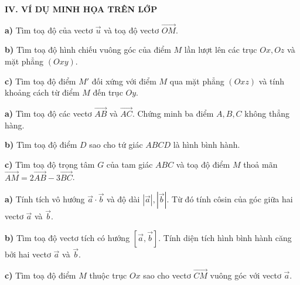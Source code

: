 \documentclass[12pt, a4paper]{article}
\begin{document}
\par\vspace{0.15cm}

\newpage

\noindent\textbf{\textcolor{deepblue}{\large IV. VÍ DỤ MINH HỌA TRÊN LỚP}}
\par\vspace{-0.15cm}

\par\vspace{0.2cm}
\textbf{a)} Tìm toạ độ của vectơ $\vec{u}$ và toạ độ vectơ $\vec{OM}$. \par\vspace{0.15cm}
\textbf{b)} Tìm toạ độ hình chiếu vuông góc của điểm $M$ lần lượt lên các trục $Ox, Oz$ và mặt phẳng $(Oxy)$. \par\vspace{0.15cm}
\textbf{c)} Tìm toạ độ điểm $M'$ đối xứng với điểm $M$ qua mặt phẳng $(Oxz)$ và tính khoảng cách từ điểm $M$ đến trục $Oy$.
\drawdashlinesfull

\par\vspace{0.2cm}
\textbf{a)} Tìm toạ độ các vectơ $\vec{AB}$ và $\vec{AC}$. Chứng minh ba điểm $A, B, C$ không thẳng hàng. \par\vspace{0.15cm}
\textbf{b)} Tìm toạ độ điểm $D$ sao cho tứ giác $ABCD$ là hình bình hành. \par\vspace{0.15cm}
\textbf{c)} Tìm toạ độ trọng tâm $G$ của tam giác $ABC$ và toạ độ điểm $M$ thoả mãn $\vec{AM} = 2\vec{AB} - 3\vec{BC}$.
\drawdashlinesfull

\par\vspace{0.2cm}
\textbf{a)} Tính tích vô hướng $\vec{a} \cdot \vec{b}$ và độ dài $|\vec{a}|, |\vec{b}|$. Từ đó tính côsin của góc giữa hai vectơ $\vec{a}$ và $\vec{b}$. \par\vspace{0.15cm}
\textbf{b)} Tìm toạ độ vectơ tích có hướng $[\vec{a}, \vec{b}]$. Tính diện tích hình bình hành căng bởi hai vectơ $\vec{a}$ và $\vec{b}$. \par\vspace{0.15cm}
\textbf{c)} Tìm toạ độ điểm $M$ thuộc trục $Ox$ sao cho vectơ $\vec{CM}$ vuông góc với vectơ $\vec{a}$.
\drawdashlinesfull
\end{document}
